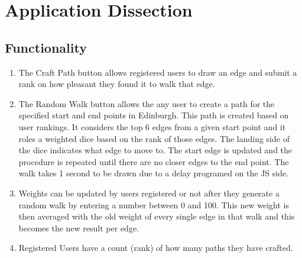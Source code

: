 \documentclass[11pt]{article}
\begin{document}
\section{Application Dissection}
\subsection{Functionality}
\begin{enumerate}
\item The Craft Path button allows registered users to draw an edge and submit a rank on how pleasant they found it to walk that edge.
\item The Random Walk button allows the any user to create a path for the specified
start and end points in Edinburgh. This path is created based on user rankings. It considers the top 6 edges from a given start point and it roles a weighted dice based on the rank of those edges. The landing side of the dice indicates what edge to move to. The start edge is updated and the procedure is repeated until there are no closer edges to the end point. The walk takes 1 second to be drawn due to a delay programed on the JS side.
\item Weights can be updated by users registered or not after they generate a random walk by entering a number between 0 and 100. This new weight is then averaged with the old weight of every single edge in that walk and this becomes the new result per edge.
\item Registered Users have a count (rank) of how many paths they have crafted.
\end{enumerate}

\newpage
\end{document}
